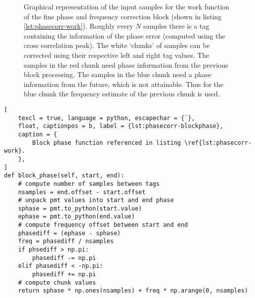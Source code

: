 \begin{figure}
	\centering
	\caption{
		Graphical representation of the input samples for the work function of the fine phase and frequency correction block (shown in listing \ref{lst:phasecorr-work}). Roughly every \(N\) samples there is a tag containing the information of the phase error (computed using the cross correlation peak). The white `chunks' of samples can be corrected using their respective left and right tag values. The samples in the red chunk need phase information from the previous block processing. The samples in the blue chunk need a phase information from the future, which is not attainable. Thus for the blue chunk the frequency estimate of the previous chunk is used.
		\label{fig:phasecorr-chunks}
	}
\end{figure}

\begin{lstlisting}[
	texcl = true, language = python, escapechar = {`},
	float, captionpos = b, label = {lst:phasecorr-blockphase},
	caption = {
		Block phase function referenced in listing \ref{lst:phasecorr-work}.
	},
]
def block_phase(self, start, end):
	# compute number of samples between tags
	nsamples = end.offset - start.offset
	# unpack pmt values into start and end phase
	sphase = pmt.to_python(start.value)
	ephase = pmt.to_python(end.value)
	# compute frequency offset between start and end
	phasediff = (ephase - sphase)
	freq = phasediff / nsamples
	if phsediff > np.pi:
		phasediff -= np.pi
	elif phasediff < -np.pi:
		phasediff += np.pi
	# compute chunk values
	return sphase * np.ones(nsamples) + freq * np.arange(0, nsamples)
\end{lstlisting}

